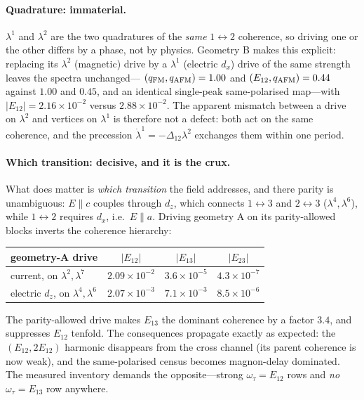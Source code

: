 \documentclass[11pt]{article}
\newcommand{\qafm}{q_{\rm AFM}}
\newcommand{\qfm}{q_{\rm FM}}
\begin{document}
\paragraph{Quadrature: immaterial.}
$\lambda^1$ and $\lambda^2$ are the two quadratures of the \emph{same}
$1\!\leftrightarrow\!2$ coherence, so driving one or the other differs by a
phase, not by physics.  Geometry B makes this explicit: replacing its
$\lambda^2$ (magnetic) drive by a $\lambda^1$ (electric $d_x$) drive of the
same strength leaves the spectra unchanged---
$(\qfm,\qafm)=1.00$ and $(E_{12},\qafm)=0.44$ against $1.00$ and $0.45$, and
an identical single-peak same-polarised map---with
$|E_{12}|=2.16\times10^{-2}$ versus $2.88\times10^{-2}$.  The apparent
mismatch between a drive on $\lambda^2$ and vertices on $\lambda^1$ is
therefore not a defect: both act on the same coherence, and the precession
$\dot\lambda^1=-\Delta_{12}\lambda^2$ exchanges them within one period.

\paragraph{Which transition: decisive, and it is the crux.}
What does matter is \emph{which transition} the field addresses, and there
parity is unambiguous: $E\!\parallel\!c$ couples through $d_z$, which connects
$1\!\leftrightarrow\!3$ and $2\!\leftrightarrow\!3$ ($\lambda^{4},\lambda^{6}$),
while $1\!\leftrightarrow\!2$ requires $d_{x}$, i.e.\ $E\!\parallel\!a$.
Driving geometry A on its parity-allowed blocks inverts the coherence
hierarchy:
\begin{center}\small
\renewcommand{\arraystretch}{1.25}
\begin{tabular}{lccc}
\toprule
geometry-A drive & $|E_{12}|$ & $|E_{13}|$ & $|E_{23}|$\\
\midrule
current, on $\lambda^{2},\lambda^{7}$ & $2.09\times10^{-2}$ &
  $3.6\times10^{-5}$ & $4.3\times10^{-7}$\\
electric $d_z$, on $\lambda^{4},\lambda^{6}$ & $2.07\times10^{-3}$ &
  $7.1\times10^{-3}$ & $8.5\times10^{-6}$\\
\bottomrule
\end{tabular}
\end{center}
The parity-allowed drive makes $E_{13}$ the dominant coherence by a factor
$3.4$, and suppresses $E_{12}$ tenfold.  The consequences propagate exactly as
expected: the $(E_{12},2E_{12})$ harmonic disappears from the cross channel
(its parent coherence is now weak), and the same-polarised census becomes
magnon-delay dominated.  The measured inventory demands the opposite---strong
$\omega_\tau=E_{12}$ rows and \emph{no} $\omega_\tau=E_{13}$ row anywhere.
\end{document}
